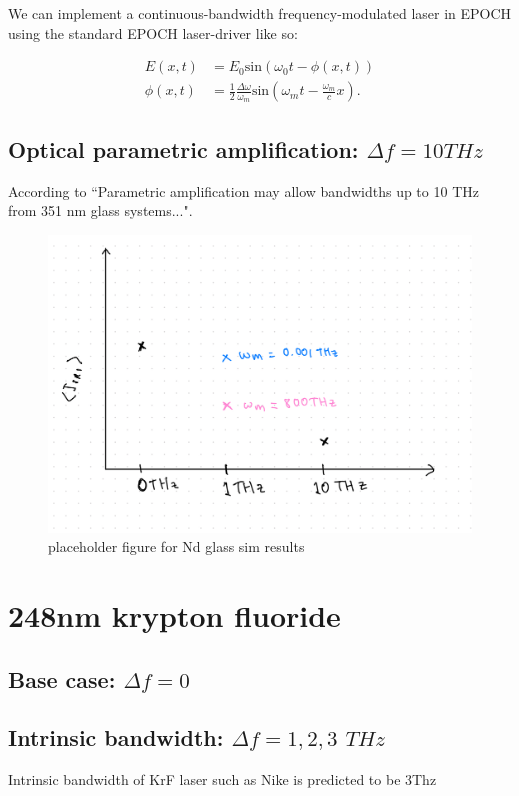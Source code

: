 We can implement a continuous-bandwidth frequency-modulated laser in EPOCH using the standard EPOCH laser-driver like so:

\begin{equation}
\begin{aligned}
   E(x,t) &= E_0\text{sin}\left(\omega_0 t - \phi(x,t)\right) \\
   \phi(x,t) &= \frac{1}{2}\frac{\Delta\omega}{\omega_m}\text{sin}\left(\omega_mt - \frac{\omega_m}{c}x\right).
\end{aligned}
\end{equation}

\subsection{Optical parametric amplification: $\Delta f=10\si{THz}$}
According to \citet{Lehmberg2020} ``Parametric amplification may allow bandwidths up to 10 THz from 351 nm glass systems...".


\begin{figure}[ht]
   \centering
    \includegraphics[width=0.75\columnwidth]{Chapters/C5_broadband/ndglass_placeholder.jpeg}
    \caption{placeholder figure for Nd glass sim results}
    \label{fig:NdGlass}
\end{figure}{}

\section{248nm krypton fluoride}\label{sec:248}

\subsection{Base case: $\Delta f=0$}




\subsection{Intrinsic bandwidth: $\Delta f=1,2,3$ $\si{THz}$}
Intrinsic bandwidth of KrF laser such as Nike is predicted to be 3Thz \citep{Obenschain15}

